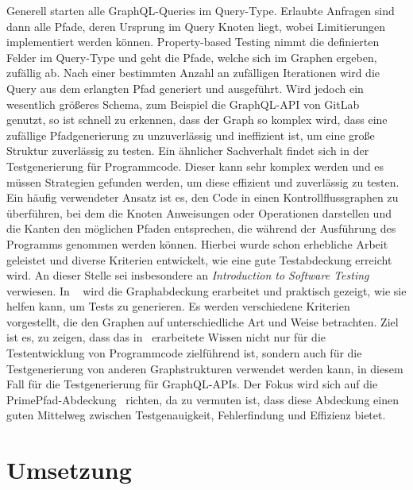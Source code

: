 Generell starten alle GraphQL-Queries im Query-Type.
Erlaubte Anfragen sind dann alle Pfade, deren Ursprung im Query Knoten liegt, wobei Limitierungen implementiert werden können.
Property-based Testing nimmt die definierten Felder im Query-Type und geht die Pfade, welche sich im Graphen ergeben, zufällig ab.
Nach einer bestimmten Anzahl an zufälligen Iterationen wird die Query aus dem erlangten Pfad generiert und ausgeführt.
Wird jedoch ein wesentlich größeres Schema, zum Beispiel die GraphQL-API von GitLab~\cite{gitlab} genutzt, so ist schnell zu erkennen, dass
der Graph so komplex wird, dass eine zufällige Pfadgenerierung zu unzuverlässig und ineffizient ist, um
eine große Struktur zuverlässig zu testen.
Ein ähnlicher Sachverhalt findet sich in der Testgenerierung für Programmcode.
Dieser kann sehr komplex werden und es müssen Strategien gefunden werden, um diese effizient und zuverlässig zu testen.
Ein häufig verwendeter Ansatz ist es, den Code in einen Kontrollflussgraphen zu überführen, bei dem die Knoten Anweisungen oder Operationen darstellen
und die Kanten den möglichen Pfaden entsprechen, die während der Ausführung des Programms genommen werden können.
Hierbei wurde schon erhebliche Arbeit geleistet und diverse Kriterien entwickelt, wie eine gute Testabdeckung erreicht wird.
An dieser Stelle sei insbesondere an \textit{Introduction to Software Testing}~\cite{software-testing} verwiesen.
In ~\cite{software-testing} wird die Graphabdeckung erarbeitet und praktisch gezeigt, wie sie helfen kann, um Tests zu generieren.
Es werden verschiedene Kriterien vorgestellt, die den Graphen auf unterschiedliche Art und Weise betrachten.
Ziel ist es, zu zeigen, dass das in~\cite{software-testing} erarbeitete Wissen nicht nur für die Testentwicklung von Programmcode zielführend ist,
sondern auch für die Testgenerierung von anderen Graphstrukturen verwendet werden kann, in diesem Fall für die Testgenerierung für GraphQL-APIs.
Der Fokus wird sich auf die PrimePfad-Abdeckung~\cite[vgl. Criterion 2.4]{software-testing} richten, da zu vermuten ist, dass diese
Abdeckung einen guten Mittelweg zwischen Testgenauigkeit, Fehlerfindung und Effizienz bietet.

\section{Umsetzung}

